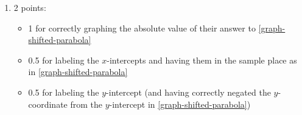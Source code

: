 \documentclass{article}
\begin{document}
\begin{enumerate}
\begin{enumerate}
\begin{grading}
    \end{grading}

    \begin{problem}[\vfill]
      $y = (x-1)^2 - 4$. In addition to labeling any intercepts and asymptotes, label the lowest point on the graph with its coordinates. (The shape of this graph is called a \uline{parabola}, and the lowest point is called the \uline{vertex}.)
    \end{problem}

    \begin{solution}
      Starting with the graph of $y=x^2$, we shift 1 unit to the right and 4 units down.
      
      To find the $y$-intercept, we set $x$ equal to zero and solve for $y$: $y=(0-1)^2-4=-3$. 
      To find the $x$-intercepts, we set $y$ equal to zero and solve for $x$:
      \begin{align*}
          0 &= (x-1)^2-4 \\
          &= x^2 - 2x -3 \\
          &= (x-3)(x+1) \\
          &\therefore\, x=-1,\,3.
      \end{align*}
      

    \end{solution}

  \item

    \begin{grading}
      2 points:
      \begin{itemize}[nosep]
      \item 1 for correctly graphing the absolute value of their answer to \ref{graph-shifted-parabola}
      \item 0.5 for labeling the $x$-intercepts and having them in the sample place as in \ref{graph-shifted-parabola}
      \item 0.5 for labeling the $y$-intercept (and having correctly negated the $y$-coordinate from the $y$-intercept in \ref{graph-shifted-parabola})
      \end{itemize}
    \end{grading}


\end{enumerate}
\end{enumerate}
\end{document}
